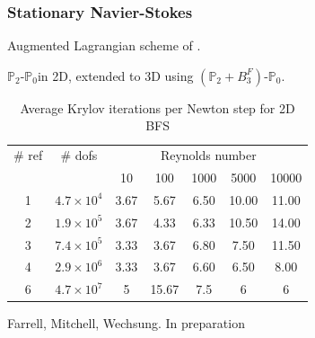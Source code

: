 \documentclass[presentation,aspectratio=43]{beamer}
\begin{document}
\begin{frame}
  \frametitle{Stationary Navier-Stokes}
\newcommand{\PtwoPzero}{\ensuremath{\mathbb{P}_2\text{-}\mathbb{P}_0}}
\newcommand{\fmw}{\ensuremath{\left(\mathbb{P}_2 + B^F_3\right)}}
\newcommand{\fmwzero}{\ensuremath{\fmw\text{-}\mathbb{P}_0}}
Augmented Lagrangian scheme of \textcite{Benzi:2006}.

\PtwoPzero in 2D, extended to 3D using \fmwzero.

{\footnotesize
    \begin{table}
      \centering
      \begin{tabular}{cc|ccccc}
        \# ref & \# dofs & \multicolumn{5}{c}{Reynolds number} \\
               && 10 & 100 & 1000 & 5000 & 10000 \\
        \hline
        1 & $4.7 \times 10^4$ & 3.67 & 5.67 & 6.50 & 10.00 & 11.00 \\
        2 & $1.9 \times 10^5$ & 3.67 & 4.33 & 6.33 & 10.50 & 14.00 \\
        3 & $7.4 \times 10^5$ & 3.33 & 3.67 & 6.80 & 7.50  & 11.50 \\
        4 & $2.9 \times 10^6$ & 3.33 & 3.67 & 6.60 & 6.50 & 8.00 \\
        6 & $4.7 \times 10^7$ & 5 & 15.67 & 7.5 & 6 & 6 \\
      \end{tabular}
      \caption{Average Krylov iterations per Newton step for 2D BFS}
      \label{tab:bfs}
    \end{table}
  }
\begin{flushright}
  {\footnotesize Farrell, Mitchell, Wechsung.  In preparation}
\end{flushright}
\end{frame}
\end{document}
